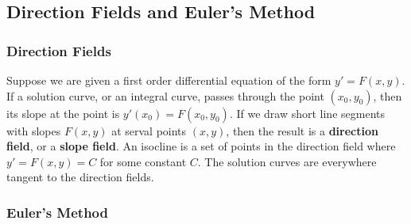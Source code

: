 \subsection{Direction Fields and Euler's Method}
\subsubsection{Direction Fields}
Suppose we are given a first order differential equation of the form \(y'=F(x,y)\).
If a solution curve, or an integral curve, passes through the point
\((x_0,y_0)\), then its slope at the point is \(y'(x_0)=F(x_0,y_0)\).
If we draw short line segments with slopes \(F(x,y)\) at serval points
\((x,y)\), then the result is a \textbf{direction field}, or a
\textbf{slope field}.
An isocline is a set of points in the direction field where \(y'=F(x,y)=C\)
for some constant \(C\).
The solution curves are everywhere tangent to the direction fields.

\subsubsection{Euler's Method}